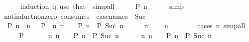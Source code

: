 \begin{isabellebody}
\ \ \ \ \isamarkupfalse%
\ {\isacharparenleft}{\kern0pt}induction\ q{\isacharparenright}{\kern0pt}\ {\isacharparenleft}{\kern0pt}use\ that\ \ simp{\isacharunderscore}{\kern0pt}all{\isacharparenright}{\kern0pt}\isanewline
\ \ \isamarkupfalse%
\ \isamarkupfalse%
\ {\isachardoublequoteopen}P\ n{\isachardoublequoteclose}\isanewline
\ \ \ \ \isamarkupfalse%
\ simp\isanewline
{}\isamarkupfalse%
%
\endisatagproof
{\isafoldproof}%
%
\isadelimproof
\isanewline
%
\endisadelimproof
\isanewline
{}\isamarkupfalse%
\ nat{\isacharunderscore}{\kern0pt}induct{\isacharunderscore}{\kern0pt}non{\isacharunderscore}{\kern0pt}zero\ {\isacharbrackleft}{\kern0pt}consumes\ {}{\isacharcomma}{\kern0pt}\ case{\isacharunderscore}{\kern0pt}names\ {}\ Suc{\isacharbrackright}{\kern0pt}{\isacharcolon}{\kern0pt}\isanewline
\ \ {\isachardoublequoteopen}P\ n{\isachardoublequoteclose}\ \ {\isachardoublequoteopen}n\ {\isachargreater}{\kern0pt}\ {}{\isachardoublequoteclose}\ {\isachardoublequoteopen}P\ {}{\isachardoublequoteclose}\ {\isachardoublequoteopen}{\isasymAnd}n{\isachardot}{\kern0pt}\ n\ {\isachargreater}{\kern0pt}\ {}\ {\isasymLongrightarrow}\ P\ n\ {\isasymLongrightarrow}\ P\ {\isacharparenleft}{\kern0pt}Suc\ n{\isacharparenright}{\kern0pt}{\isachardoublequoteclose}\isanewline
%
\isadelimproof
%
\endisadelimproof
%
\isatagproof
{}\isamarkupfalse%
\ {\isacharminus}{\kern0pt}\isanewline
\ \ \isamarkupfalse%
\ {\isacartoucheopen}n\ {\isachargreater}{\kern0pt}\ {}{\isacartoucheclose}\ \isamarkupfalse%
\ {\isachardoublequoteopen}n\ {\isasymge}\ {}{\isachardoublequoteclose}\isanewline
\ \ \ \ \isamarkupfalse%
\ {\isacharparenleft}{\kern0pt}cases\ n{\isacharparenright}{\kern0pt}\ simp{\isacharunderscore}{\kern0pt}all\isanewline
\ \ \isamarkupfalse%
\ \isamarkupfalse%
\ {\isacartoucheopen}P\ {}{\isacartoucheclose}\isanewline
\ \ \isamarkupfalse%
\ \isamarkupfalse%
\ {\isachardoublequoteopen}{\isasymAnd}n{\isachardot}{\kern0pt}\ n\ {\isasymge}\ {}\ {\isasymLongrightarrow}\ P\ n\ {\isasymLongrightarrow}\ P\ {\isacharparenleft}{\kern0pt}Suc\ n{\isacharparenright}{\kern0pt}{\isachardoublequoteclose}\isanewline
\ \ \ \ \isamarkupfalse%
\ {\isacartoucheopen}{\isasymAnd}n{\isachardot}{\kern0pt}\ n\ {\isachargreater}{\kern0pt}\ {}\ {\isasymLongrightarrow}\ P\ n\ {\isasymLongrightarrow}\ P\ {\isacharparenleft}{\kern0pt}Suc\ n{\isacharparenright}{\kern0pt}{\isacartoucheclose}\isanewline

\end{isabellebody}
